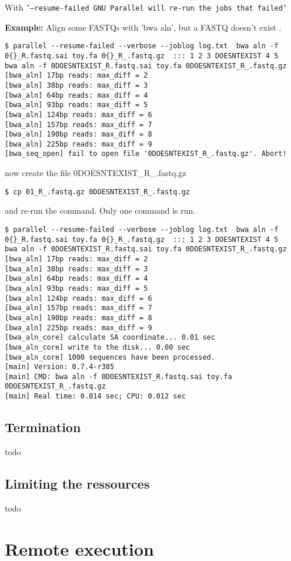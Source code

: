 \documentclass{article}
\newcommand{\example}[1]{
\textbf{Example: } {\color[rgb]{0,0,1} #1 } .
}
\newcommand{\cmdoption}[1]{\texttt{'#1'}}
\begin{document}
With \cmdoption{--resume-failed GNU Parallel will re-run the jobs that failed}
\example{Align some FASTQs with 'bwa aln', but a FASTQ doesn't exist}
\begin{lstlisting}
$ parallel --resume-failed --verbose --joblog log.txt  bwa aln -f 0{}_R.fastq.sai toy.fa 0{}_R_.fastq.gz  ::: 1 2 3 DOESNTEXIST 4 5
bwa aln -f 0DOESNTEXIST_R.fastq.sai toy.fa 0DOESNTEXIST_R_.fastq.gz
[bwa_aln] 17bp reads: max_diff = 2
[bwa_aln] 38bp reads: max_diff = 3
[bwa_aln] 64bp reads: max_diff = 4
[bwa_aln] 93bp reads: max_diff = 5
[bwa_aln] 124bp reads: max_diff = 6
[bwa_aln] 157bp reads: max_diff = 7
[bwa_aln] 190bp reads: max_diff = 8
[bwa_aln] 225bp reads: max_diff = 9
[bwa_seq_open] fail to open file '0DOESNTEXIST_R_.fastq.gz'. Abort!
\end{lstlisting}
now create the file 0DOESNTEXIST\_R\_.fastq.gz 
\begin{lstlisting}
$ cp 01_R_.fastq.gz 0DOESNTEXIST_R_.fastq.gz
\end{lstlisting}
and re-run the command. Only one command is run.
\begin{lstlisting}
$ parallel --resume-failed --verbose --joblog log.txt  bwa aln -f 0{}_R.fastq.sai toy.fa 0{}_R_.fastq.gz  ::: 1 2 3 DOESNTEXIST 4 5
bwa aln -f 0DOESNTEXIST_R.fastq.sai toy.fa 0DOESNTEXIST_R_.fastq.gz
[bwa_aln] 17bp reads: max_diff = 2
[bwa_aln] 38bp reads: max_diff = 3
[bwa_aln] 64bp reads: max_diff = 4
[bwa_aln] 93bp reads: max_diff = 5
[bwa_aln] 124bp reads: max_diff = 6
[bwa_aln] 157bp reads: max_diff = 7
[bwa_aln] 190bp reads: max_diff = 8
[bwa_aln] 225bp reads: max_diff = 9
[bwa_aln_core] calculate SA coordinate... 0.01 sec
[bwa_aln_core] write to the disk... 0.00 sec
[bwa_aln_core] 1000 sequences have been processed.
[main] Version: 0.7.4-r385
[main] CMD: bwa aln -f 0DOESNTEXIST_R.fastq.sai toy.fa 0DOESNTEXIST_R_.fastq.gz
[main] Real time: 0.014 sec; CPU: 0.012 sec
\end{lstlisting}
\subsection{Termination}
todo

\subsection{Limiting the ressources}
todo

\section{Remote execution}
\end{document}
